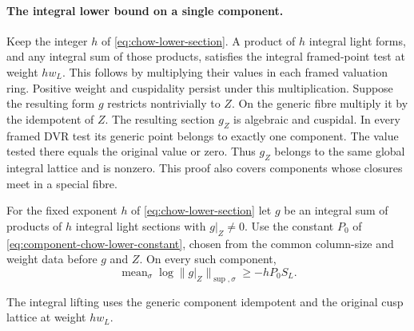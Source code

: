 \paragraph{The integral lower bound on a single component.}
\hypertarget{source-slice-metrics}{}
Keep the integer \(h\) of \eqref{eq:chow-lower-section}. A product
of \(h\) integral light forms, and any integral sum of those
products, satisfies the integral framed-point test at weight
\(h w_L\). This follows by multiplying their values in each framed
valuation ring. Positive weight and cuspidality persist under this
multiplication. Suppose the resulting form \(g\) restricts
nontrivially to \(Z\). On the generic fibre multiply it by the
idempotent of \(Z\). The resulting section \(g_Z\) is algebraic
and cuspidal. In every framed DVR test its generic point belongs
to exactly one component. The value tested there equals the
original value or zero. Thus \(g_Z\) belongs to the same global
integral lattice and is nonzero. This proof also covers components
whose closures meet in a special fibre.

\begin{proposition}\label{prop:integral-chow-component-height}
For the fixed exponent \(h\) of \eqref{eq:chow-lower-section}
let \(g\) be an integral sum of products of \(h\) integral
light sections with \(g|_Z\ne0\).
Use the constant \(P_0\) of \eqref{eq:component-chow-lower-constant},
chosen from the common column-size and weight data before \(g\) and \(Z\).
On every such component,
\[
 \operatorname{mean}_\sigma\log\|g|_Z\|_{\sup,\sigma}\ge-hP_0S_L.
\]

The integral lifting uses the generic component idempotent
and the original cusp lattice at weight \(h w_L\).
\end{proposition}


